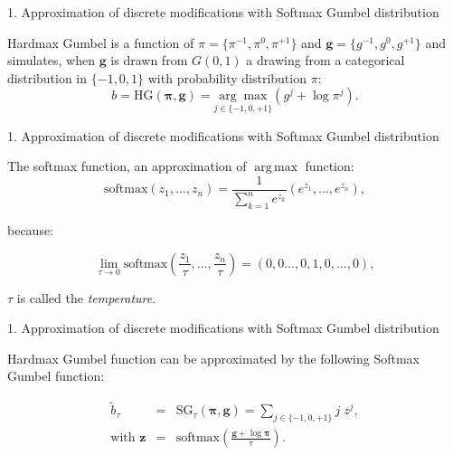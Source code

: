 \documentclass[10pt]{beamer}
\renewcommand{\vec}[1]{\mathbf{#1}}
\DeclareMathOperator*{\argmax}{arg\,max}
\begin{document}
\begin{frame}{1. Approximation of discrete modifications with Softmax Gumbel distribution}

\begin{tcolorbox}[colback=lightgreen,colframe=greentheme,title=\textbf{Definition} (Hardmax Gumbel Function)]

Hardmax Gumbel is a function of  $\pi = \{\pi^{-1},\pi^{0}, \pi^{+1}\}$ and $\vec{g} = \{g^{-1},g^{0}, g^{+1}\}$ and simulates, when $\vec{g}$ is drawn from $G(0,1)$ a drawing from a categorical distribution in $\{-1,0,1\}$ with probability distribution $\pi$:  
    \begin{equation}
\label{eq:gumbel}
b = \mbox{HG}(\bm{\pi}, \vec{g}) = \underset{{j \in \{-1,0,+1\}}}{\arg \max} (g^j+ \log \pi^j).
\end{equation}
\end{tcolorbox}

\end{frame}

\begin{frame}{1. Approximation of discrete modifications with Softmax Gumbel distribution}
    
The softmax function, an approximation of $\argmax$ function:
$$ \mbox{softmax}\left(z_1,\ldots,z_n\right) = \frac{1}{\sum_{k=1}^n e^{z_k}}(e^{z_1},\ldots,e^{z_n}),$$

because: 

$$
\lim_{\tau \rightarrow 0} \mbox{softmax}\left(\frac{z_1}{\tau},\ldots,\frac{z_n}{\tau}\right) = (0,0\ldots,0,1,0,\dots, 0), 
$$

\pause
$\tau$ is called the \emph{temperature}.
\end{frame}

\begin{frame}{1. Approximation of discrete modifications with Softmax Gumbel distribution}
\begin{tcolorbox}[colback=lightgreen,colframe=greentheme,title=\textbf{Definition} (Softmax Gumbel Function)]

Hardmax Gumbel function can be approximated by the following Softmax Gumbel function: 

\begin{eqnarray}\label{eq:softmaxgumbel} 
\tilde{b}_{\tau} &=& \mbox{SG}_\tau(\bm{\pi}, \vec{g}) = \sum_{j \in \{-1,0,+1\}} j\;z^j,\\
\text{with } \vec{z} &=& \mbox{softmax}\left(\frac{\vec{g}+\log \bm{\pi}}{\tau}\right).
\end{eqnarray}

\end{tcolorbox}
\end{frame}
\end{document}
